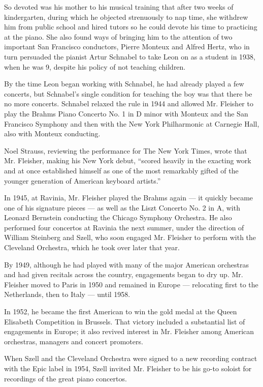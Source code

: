 So devoted was his mother to his musical training that after two weeks
of kindergarten, during which he objected strenuously to nap time, she
withdrew him from public school and hired tutors so he could devote his
time to practicing at the piano. She also found ways of bringing him to
the attention of two important San Francisco conductors, Pierre Monteux
and Alfred Hertz, who in turn persuaded the pianist Artur Schnabel to
take Leon on as a student in 1938, when he was 9, despite his policy of
not teaching children.

By the time Leon began working with Schnabel, he had already played a
few concerts, but Schnabel's single condition for teaching the boy was
that there be no more concerts. Schnabel relaxed the rule in 1944 and
allowed Mr. Fleisher to play the Brahms Piano Concerto No. 1 in D minor
with Monteux and the San Francisco Symphony and then with the New York
Philharmonic at Carnegie Hall, also with Monteux conducting.

Noel Strauss, reviewing the performance for The New York Times, wrote
that Mr. Fleisher, making his New York debut, ``scored heavily in the
exacting work and at once established himself as one of the most
remarkably gifted of the younger generation of American keyboard
artists.''

In 1945, at Ravinia, Mr. Fleisher played the Brahms again --- it quickly
became one of his signature pieces --- as well as the Liszt Concerto No.
2 in A, with Leonard Bernstein conducting the Chicago Symphony
Orchestra. He also performed four concertos at Ravinia the next summer,
under the direction of William Steinberg and Szell, who soon engaged Mr.
Fleisher to perform with the Cleveland Orchestra, which he took over
later that year.

By 1949, although he had played with many of the major American
orchestras and had given recitals across the country, engagements began
to dry up. Mr. Fleisher moved to Paris in 1950 and remained in Europe
--- relocating first to the Netherlands, then to Italy --- until 1958.

In 1952, he became the first American to win the gold medal at the Queen
Elisabeth Competition in Brussels. That victory included a substantial
list of engagements in Europe; it also revived interest in Mr. Fleisher
among American orchestras, managers and concert promoters.

When Szell and the Cleveland Orchestra were signed to a new recording
contract with the Epic label in 1954, Szell invited Mr. Fleisher to be
his go-to soloist for recordings of the great piano concertos.

